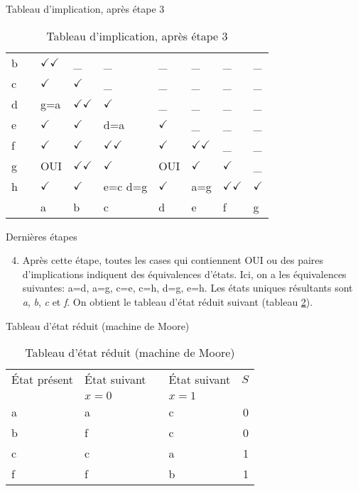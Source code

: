 \documentclass[presentation]{beamer}
\begin{document}
\begin{frame}[label={sec:org9068bde}]{Tableau d'implication, après étape 3}
\begin{table}[htbp]
\caption{\label{tab:org8dee084}Tableau d'implication, après étape 3}
\centering
\begin{tabular}{lllllllll}
b &  & \(\checkmark \checkmark\) & \_ & \_ & \_ & \_ & \_ & \_\\[0pt]
c &  & \(\checkmark\) & \(\checkmark\) & \_ & \_ & \_ & \_ & \_\\[0pt]
d &  & g=a & \(\checkmark \checkmark\) & \(\checkmark\) & \_ & \_ & \_ & \_\\[0pt]
e &  & \(\checkmark\) & \(\checkmark\) & d=a & \(\checkmark\) & \_ & \_ & \_\\[0pt]
f &  & \(\checkmark\) & \(\checkmark\) & \(\checkmark \checkmark\) & \(\checkmark\) & \(\checkmark \checkmark\) & \_ & \_\\[0pt]
g &  & OUI & \(\checkmark \checkmark\) & \(\checkmark\) & OUI & \(\checkmark\) & \(\checkmark\) & \_\\[0pt]
h &  & \(\checkmark\) & \(\checkmark\) & e=c d=g & \(\checkmark\) & a=g & \(\checkmark \checkmark\) & \(\checkmark\)\\[0pt]
\hline
 &  & a & b & c & d & e & f & g\\[0pt]
\end{tabular}
\end{table}
\end{frame}

\begin{frame}[label={sec:orge8864ea}]{Dernières étapes}
\begin{enumerate}
\setcounter{enumi}{3}
\item Après cette étape, toutes les  cases qui contiennent OUI ou des
paires d'implications indiquent des équivalences d'états. Ici, on a
les équivalences suivantes: a=d, a=g, c=e, c=h, d=g, e=h. Les états
uniques résultants sont \emph{a}, \emph{b}, \emph{c} et \emph{f}. On obtient le tableau
d'état réduit suivant (tableau \ref{tab:orgbf415f4}).
\end{enumerate}
\end{frame}

\begin{frame}[label={sec:org0f57999}]{Tableau d'état réduit (machine de Moore)}
\begin{table}[htbp]
\caption{\label{tab:orgbf415f4}Tableau d'état réduit (machine de Moore)}
\centering
\begin{tabular}{llllr}
État présent & État suivant &  & État suivant & \(S\)\\[0pt]
 & \(x=0\) &  & \(x=1\) & \\[0pt]
\hline
a & a &  & c & 0\\[0pt]
b & f &  & c & 0\\[0pt]
c & c &  & a & 1\\[0pt]
f & f &  & b & 1\\[0pt]
\end{tabular}
\end{table}
\end{frame}
\end{document}
